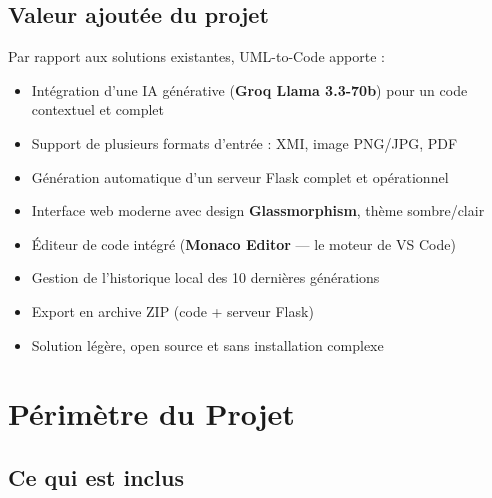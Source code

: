 \documentclass[12pt,a4paper]{article}
\begin{document}
\subsection{Valeur ajoutée du projet}

Par rapport aux solutions existantes, UML-to-Code apporte :
\begin{itemize}[leftmargin=1.5em]
  \item Intégration d'une IA générative (\textbf{Groq Llama 3.3-70b}) pour un code contextuel et complet
  \item Support de plusieurs formats d'entrée : XMI, image PNG/JPG, PDF
  \item Génération automatique d'un serveur Flask complet et opérationnel
  \item Interface web moderne avec design \textbf{Glassmorphism}, thème sombre/clair
  \item Éditeur de code intégré (\textbf{Monaco Editor} — le moteur de VS Code)
  \item Gestion de l'historique local des 10 dernières générations
  \item Export en archive ZIP (code + serveur Flask)
  \item Solution légère, open source et sans installation complexe
\end{itemize}

\section{Périmètre du Projet}

\subsection{Ce qui est inclus}
\end{document}

